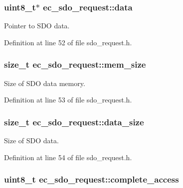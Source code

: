 \subsubsection[{data}]{\setlength{\rightskip}{0pt plus 5cm}uint8\-\_\-t$\ast$ {\bf ec\-\_\-sdo\-\_\-request\-::data}}\label{structec__sdo__request_aa1f9c68c95c5fde23ed0807abf884b08}


\-Pointer to \-S\-D\-O data. 



\-Definition at line 52 of file sdo\-\_\-request.\-h.

\subsubsection[{mem\-\_\-size}]{\setlength{\rightskip}{0pt plus 5cm}size\-\_\-t {\bf ec\-\_\-sdo\-\_\-request\-::mem\-\_\-size}}\label{structec__sdo__request_a6275d28bba5bc2a428915b717fe425e5}


\-Size of \-S\-D\-O data memory. 



\-Definition at line 53 of file sdo\-\_\-request.\-h.

\subsubsection[{data\-\_\-size}]{\setlength{\rightskip}{0pt plus 5cm}size\-\_\-t {\bf ec\-\_\-sdo\-\_\-request\-::data\-\_\-size}}\label{structec__sdo__request_a9a094314f738ed0fdf4b46f4bd37dfe9}


\-Size of \-S\-D\-O data. 



\-Definition at line 54 of file sdo\-\_\-request.\-h.

\subsubsection[{complete\-\_\-access}]{\setlength{\rightskip}{0pt plus 5cm}uint8\-\_\-t {\bf ec\-\_\-sdo\-\_\-request\-::complete\-\_\-access}}\label{structec__sdo__request_a98a6142382d920ac06195dd6b6de2990}


